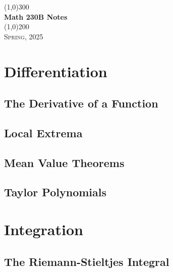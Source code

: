 \documentclass[a4paper, openany]{book}
\begin{document}
\begin{titlepage}
    \begin{center}
        \line(1,0){300} \\
        [0.25in]
        \huge{\bfseries Math 230B Notes} \\
        [2mm]
        \line(1,0){200} \\
        [1.5cm]
        \textsc{\LARGE Spring, 2025}
    \end{center}
\end{titlepage}

\tableofcontents
\setcounter{section}{0}

\chapter{Differentiation}

\section{The Derivative of a Function}

\newpage

\section{Local Extrema}

\newpage

\section{Mean Value Theorems}

\newpage

\section{Taylor Polynomials}

\newpage

\chapter{Integration}

\section{The Riemann-Stieltjes Integral}

\newpage
\end{document}
